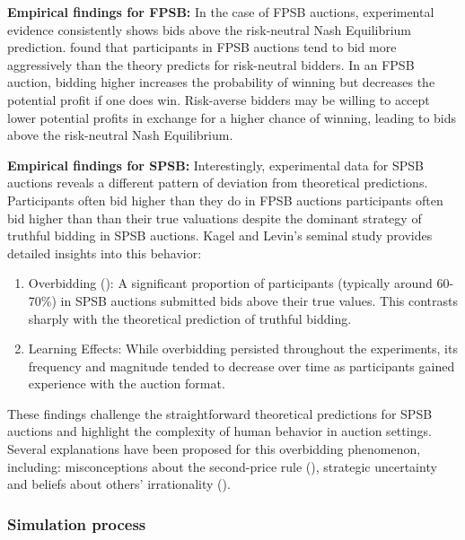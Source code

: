 \documentclass{article} %
\begin{document}
\textbf{Empirical findings for FPSB:}
In the case of FPSB auctions, experimental evidence consistently shows bids above the risk-neutral Nash Equilibrium prediction. \cite{cox1986controlled} found that participants in FPSB auctions tend to bid more aggressively than the theory predicts for risk-neutral bidders.
In an FPSB auction, bidding higher increases the probability of winning but decreases the potential profit if one does win. 
Risk-averse bidders may be willing to accept lower potential profits in exchange for a higher chance of winning, leading to bids above the risk-neutral Nash Equilibrium.

\textbf{Empirical findings for SPSB:}
Interestingly, experimental data for SPSB auctions reveals a different pattern of deviation from theoretical predictions. Participants often bid higher than they do in FPSB auctions participants often bid higher than than their true valuations despite the dominant strategy of truthful bidding in SPSB auctions.
Kagel and Levin's seminal study \cite{kagel1993independent} provides detailed insights into this behavior:
\begin{enumerate}
    \item Overbidding (\cite{kagel1987information}): A significant proportion of participants (typically around 60-70\%) in SPSB auctions submitted bids above their true values. This contrasts sharply with the theoretical prediction of truthful bidding.
    \item Learning Effects: While overbidding persisted throughout the experiments, its frequency and magnitude tended to decrease over time as participants gained experience with the auction format.
\end{enumerate}

These findings challenge the straightforward theoretical predictions for SPSB auctions and highlight the complexity of human behavior in auction settings. Several explanations have been proposed for this overbidding phenomenon, including: misconceptions about the second-price rule (\cite{kagel1987information}), strategic uncertainty and beliefs about others' irrationality (\cite{crawford2007level}).




\subsubsection{Simulation process}
\end{document}
